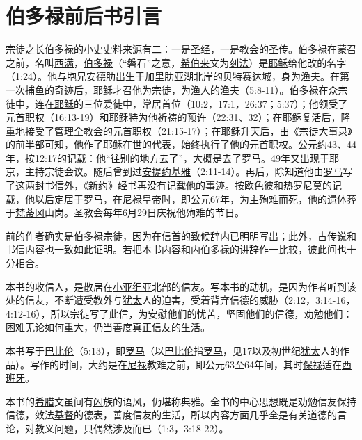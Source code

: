 \chapter*{伯多禄前后书引言}


宗徒之长\uline{伯多禄}的小史史料来源有二：一是圣经，一是教会的圣传。\uline{伯多禄}在蒙召之前，名叫\uline{西满}，\uline{伯多禄}（“磐石”之意，\uline{希伯来}文为\uline{刻法}）是\uline{耶稣}给他改的名字（1:24）。他与胞兄\uline{安德肋}出生于\uline{加里肋亚}湖北岸的\uline{贝特赛达}城，身为渔夫。在第一次捕鱼的奇迹后，\uline{耶稣}才召他为宗徒，为渔人的渔夫（5:8-11）。\uline{伯多禄}在众宗徒中，连在\uline{耶稣}的三位爱徒中，常居首位（10:2，17:1，26:37；5:37）；他领受了元首职权（16:13-19）和\uline{耶稣}特为他祈祷的预许（22:31、32）；在\uline{耶稣}复活后，隆重地接受了管理全教会的元首职权（21:15-17）；在\uline{耶稣}升天后，由《宗徒大事录》的前半部可知，他作了\uline{耶稣}在世的代表，始终执行了他的元首职权。公元约43、44年，按12:17的记载：他“往别的地方去了”，大概是去了\uline{罗马}。49年又出现于\uline{耶}京，主持宗徒会议。随后曾到过\uline{安提约基}\uline{雅}（2:11-14）。再后，除知道他由\uline{罗马}写了这两封书信外，《新约》经书再没有记载他的事迹。按\uline{欧色彼}和\uline{热罗尼莫}的记载，他以后定居于\uline{罗马}，在\uline{尼禄}皇帝时，即公元67年，为主殉难而死，他的遗体葬于\uline{梵蒂冈}山岗。圣教会每年6月29日庆祝他殉难的节日。


前的作者确实是\uline{伯多禄}宗徒，因为在信首的致候辞内已明明写出；此外，古传说和书信内容也一致如此证明。若把本书内容和内\uline{伯多禄}的讲辞作一比较，彼此间也十分相合。

本书的收信人，是散居在\uline{小亚细亚}北部的信友。写本书的动机，是因为作者听到该处的信友，不断遭受教外与\uline{犹太}人的迫害，受着背弃信德的威胁（2:12，3:14-16，4:12-16），所以宗徒写了此信，为安慰他们的忧苦，坚固他们的信德，劝勉他们：困难无论如何重大，仍当善度真正信友的生活。

本书写于\uline{巴比伦}（5:13），即\uline{罗马}（以\uline{巴比伦}指\uline{罗马}，见17以及初世纪\uline{犹太}人的作品）。写作的时间，大约是在\uline{尼禄}教难之前，即公元63至64年间，其时\uline{保禄}适在\uline{西班牙}。

本书的\uline{希腊}文虽间有\uline{闪}族的语风，仍堪称典雅。全书的中心思想既是劝勉信友保持信德，效法\uline{基督}的德表，善度信友的生活，所以内容方面几乎全是有关道德的言论，对教义问题，只偶然涉及而已（1:3，3:18-22）。

